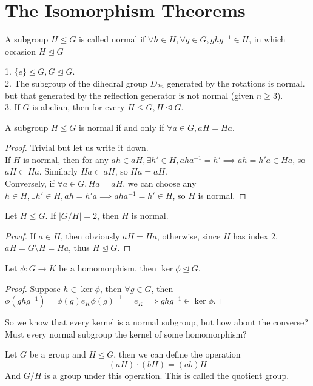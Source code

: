 \section{The Isomorphism Theorems}
\begin{definition}
    A subgroup $H\le G$ is called normal if $\forall h\in H,\forall g\in G, ghg^{-1}\in H$, in which occasion $H\unlhd G$
\end{definition}
\begin{example}
    1. $\{e\}\unlhd G,G\unlhd G$.\\
    2. The subgroup of the dihedral group $D_{2n}$ generated by the rotations is normal. but that generated by the reflection generator is not normal (given $n\ge 3$).\\
    3. If $G$ is abelian, then for every $H\le G,H\unlhd G$.
\end{example}
\begin{lemma}
    A subgroup $H\le G$ is normal if and only if $\forall a\in G,aH=Ha$.
\end{lemma}
\begin{proof}
    Trivial but let us write it down.\\
    If $H$ is normal, then for any $ah\in aH,\exists h'\in H,aha^{-1}=h'\implies ah=h'a\in Ha$, so $aH\subset Ha$.
    Similarly $Ha\subset aH$, so $Ha=aH$.\\
    Conversely, if $\forall a\in G,Ha=aH$, we can choose any $h\in H,\exists h'\in H,ah=h'a\implies aha^{-1}=h'\in H$, so $H$ is normal.
\end{proof}
\begin{corollary}
    Let $H\le G$.
    If $|G/H|=2$, then $H$ is normal.
\end{corollary}
\begin{proof}
    If $a\in H$, then obviously $aH=Ha$, otherwise, since $H$ has index $2$, $aH=G\setminus H=Ha$, thus $H\unlhd G$.
\end{proof}
\begin{proposition}
    Let $\phi:G\to K$ be a homomorphism, then $\ker\phi\unlhd G$.
\end{proposition}
\begin{proof}
    Suppose $h\in\ker\phi$, then $\forall g\in G$, then $\phi(ghg^{-1})=\phi(g)e_K\phi(g)^{-1}=e_K\implies ghg^{-1}\in\ker\phi$.
\end{proof}
So we know that every kernel is a normal subgroup, but how about the converse?
Must every normal subgroup the kernel of some homomorphism?
\begin{definition}
    Let $G$ be a group and $H\unlhd G$, then we can define the operation
    $$(aH)\cdot(bH)=(ab)H$$
    And $G/H$ is a group under this operation.
    This is called the quotient group.
\end{definition}
